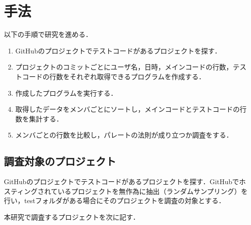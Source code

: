 \chapter{手法}
以下の手順で研究を進める．
\begin{enumerate}
\item GitHubのプロジェクトでテストコードがあるプロジェクトを探す．
\item プロジェクトのコミットごとにユーザ名，日時，メインコードの行数，テストコードの行数をそれぞれ取得できるプログラムを作成する．
\item 作成したプログラムを実行する．
\item 取得したデータをメンバごとにソートし，メインコードとテストコードの行数を集計する．
\item メンバごとの行数を比較し，パレートの法則が成り立つか調査をする．\end{enumerate}

\section{調査対象のプロジェクト}
GitHubのプロジェクトでテストコードがあるプロジェクトを探す．GitHubでホスティングされているプロジェクトを無作為に抽出（ランダムサンプリング）を行い，testフォルダがある場合にそのプロジェクトを調査の対象とする．

\newpage

本研究で調査するプロジェクトを次に記す．

